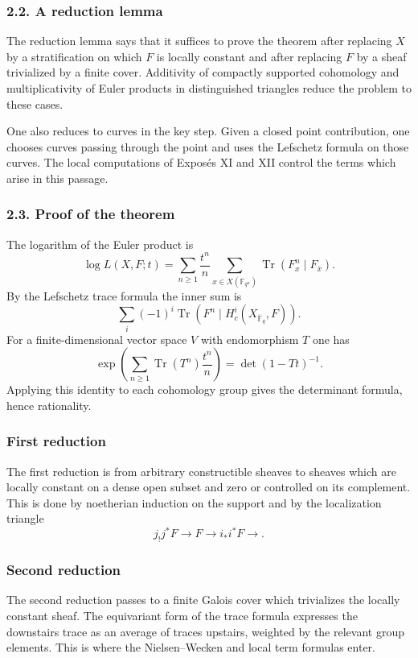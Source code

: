 \documentclass[14pt]{extarticle}
\newcommand{\FF}{\mathbb F}
\begin{document}
\subsubsection*{2.2. A reduction lemma}

The reduction lemma says that it suffices to prove the theorem after replacing $X$ by a stratification on which $F$ is locally constant and after replacing $F$ by a sheaf trivialized by a finite cover. Additivity of compactly supported cohomology and multiplicativity of Euler products in distinguished triangles reduce the problem to these cases.

One also reduces to curves in the key step. Given a closed point contribution, one chooses curves passing through the point and uses the Lefschetz formula on those curves. The local computations of Expos\'es XI and XII control the terms which arise in this passage.

\subsubsection*{2.3. Proof of the theorem}

The logarithm of the Euler product is
\[
   \log L(X,F;t)=\sum_{n\ge1}\frac{t^n}{n}
       \sum_{x\in X(\FF_{q^n})}\operatorname{Tr}(F_x^n\mid F_{\bar x}).
\]
By the Lefschetz trace formula the inner sum is
\[
   \sum_i(-1)^i\operatorname{Tr}(F^n\mid H^i_c(X_{\overline{\FF}_q},F)).
\]
For a finite-dimensional vector space $V$ with endomorphism $T$ one has
\[
   \exp\left(\sum_{n\ge1}\operatorname{Tr}(T^n)\frac{t^n}{n}\right)
      =\det(1-Tt)^{-1}.
\]
Applying this identity to each cohomology group gives the determinant formula, hence rationality.

\subsubsection*{First reduction}

The first reduction is from arbitrary constructible sheaves to sheaves which are locally constant on a dense open subset and zero or controlled on its complement. This is done by noetherian induction on the support and by the localization triangle
\[
   j_!j^*F\to F\to i_*i^*F\to.
\]

\subsubsection*{Second reduction}

The second reduction passes to a finite Galois cover which trivializes the locally constant sheaf. The equivariant form of the trace formula expresses the downstairs trace as an average of traces upstairs, weighted by the relevant group elements. This is where the Nielsen--Wecken and local term formulas enter.
\end{document}
